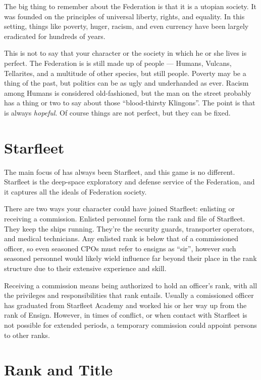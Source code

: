 \documentclass[12pt,titlepage,openany]{book}
\begin{document}
The big thing to remember about the Federation is that it is a utopian society.
It was founded on the principles of universal liberty, rights, and equality. In
this setting, things like poverty, huger, racism, and even currency have been
largely eradicated for hundreds of years.

This is not to say that your character or the society in which he or she lives
is perfect. The Federation is is still made up of people --- Humans, Vulcans,
Tellarites, and a multitude of other species, but still people. Poverty may be
a thing of the past, but politics can be as ugly and underhanded as ever.
Racism among Humans is considered old-fashioned, but the man on the street
probably has a thing or two to say about those ``blood-thirsty Klingons''. The
point is that \StarTrek{} is always \emph{hopeful}. Of course things are not
perfect, but they can be fixed.

\section{Starfleet}

The main focus of \StarTrek{} has always been Starfleet, and this game is no
different. Starfleet is the deep-space exploratory and defense service of the
Federation, and it captures all the ideals of Federation society.

There are two ways your character could have joined Starfleet: enlisting or
receiving a commission. Enlisted personnel form the rank and file of Starfleet.
They keep the ships running. They're the security guards, transporter operators,
and medical technicians. Any enlisted rank is below that of a commissioned
officer, so even seasoned CPOs must refer to ensigns as ``sir'', however such
seasoned personnel would likely wield influence far beyond their place in the
rank structure due to their extensive experience and skill.

Receiving a commission means being authorized to hold an officer's rank, with
all the privileges and responsibilities that rank entails. Usually a
comissioned officer has graduated from Starfleet Academy and worked his or her
way up from the rank of Ensign. However, in times of conflict, or when contact
with Starfleet is not possible for extended periods, a temporary commission
could appoint persons to other ranks.

\section{Rank and Title}\label{sec:orders}
\end{document}
